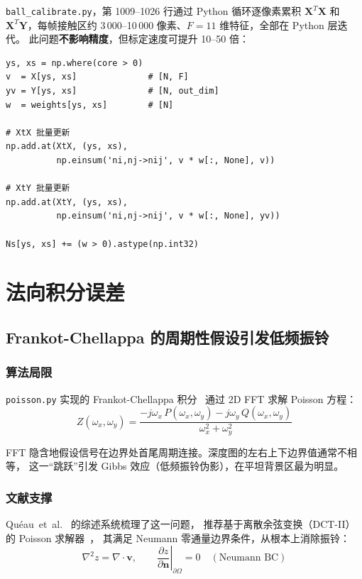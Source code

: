 \documentclass[12pt, a4paper]{ctexart}
\begin{document}
\texttt{ball\_calibrate.py}，第 1009--1026 行通过 Python 循环逐像素累积
$\mathbf{X}^T\mathbf{X}$ 和 $\mathbf{X}^T\mathbf{Y}$，每帧接触区约
3\,000--10\,000 像素、$F=11$ 维特征，全部在 Python 层迭代。
此问题\textbf{不影响精度}，但标定速度可提升 10--50 倍：

\begin{lstlisting}[caption={向量化方案（取代像素级 for 循环）}]
ys, xs = np.where(core > 0)
v  = X[ys, xs]              # [N, F]
yv = Y[ys, xs]              # [N, out_dim]
w  = weights[ys, xs]        # [N]

# XtX 批量更新
np.add.at(XtX, (ys, xs),
          np.einsum('ni,nj->nij', v * w[:, None], v))

# XtY 批量更新
np.add.at(XtY, (ys, xs),
          np.einsum('ni,nj->nij', v * w[:, None], yv))

Ns[ys, xs] += (w > 0).astype(np.int32)
\end{lstlisting}

\section{法向积分误差}
\label{sec:integration}

\subsection{Frankot-Chellappa 的周期性假设引发低频振铃}
\label{subsec:fc_ringing}

\subsubsection*{算法局限}

\texttt{poisson.py} 实现的 Frankot-Chellappa 积分~\cite{frankot1988method}
通过 2D FFT 求解 Poisson 方程：
\[
  Z(\omega_x, \omega_y)
  = \frac{-j\omega_x\, P(\omega_x, \omega_y)
          -j\omega_y\, Q(\omega_x, \omega_y)}
         {\omega_x^2 + \omega_y^2}
\]

FFT 隐含地假设信号在边界处首尾周期连接。深度图的左右上下边界值通常不相等，
这一``跳跃''引发 Gibbs 效应（低频振铃伪影），在平坦背景区最为明显。

\subsubsection*{文献支撑}

Qu\'eau~et~al.~\cite{queeau2018normal} 的综述系统梳理了这一问题，
推荐基于离散余弦变换（DCT-II）的 Poisson 求解器~\cite{simchony1990direct}，
其满足 Neumann 零通量边界条件，从根本上消除振铃：
\[
  \nabla^2 z = \nabla \cdot \mathbf{v}, \qquad
  \left.\frac{\partial z}{\partial \mathbf{n}}\right|_{\partial\Omega} = 0
  \quad (\text{Neumann BC})
\]
\end{document}
